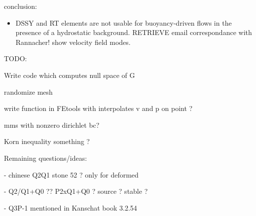 conclusion:

\begin{itemize}
\item DSSY and RT elements are not usable for buoyancy-driven flows in the presence of a hydrostatic 
background. RETRIEVE email correspondance with Rannacher! show velocity field modes. 
\end{itemize}


\newpage
TODO:

Write code which computes null space of G 

randomize mesh

write function in FEtools with interpolates v and p on point ?

mms with nonzero dirichlet bc?

Korn inequality something ?

Remaining questions/ideas:

- chinese Q2Q1 stone 52 ? only for deformed

- Q2/Q1+Q0 ??  P2xQ1+Q0  ? source ? stable ?

- Q3P-1 mentioned in Kanschat book 3.2.54



